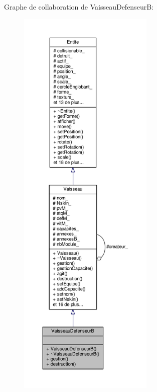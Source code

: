 Graphe de collaboration de Vaisseau\+DefenseurB\+:\nopagebreak
\begin{figure}[H]
\begin{center}
\leavevmode
\includegraphics[height=550pt]{class_vaisseau_defenseur_b__coll__graph}
\end{center}
\end{figure}
